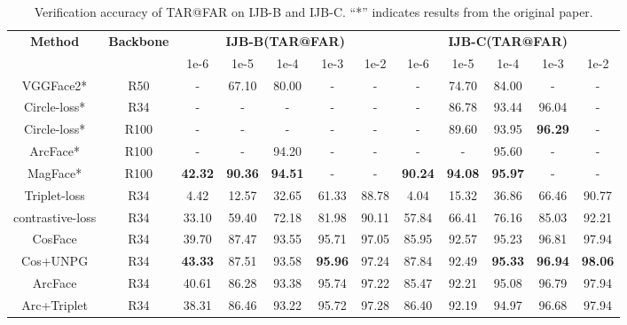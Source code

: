 \documentclass[10pt,twocolumn]{article}
\begin{document}
\begin{table*}[htb]
    \caption{Verification accuracy of TAR@FAR on IJB-B and IJB-C. “*” indicates results from the original paper.}
    \label{tab:IJBB_IJBC}
      \centering
        {\small
        \begin{tabular}[]{ c c c c c c c c c c c c }
         \hline
         \multirow{2}{*}{\textbf{Method}} & \multirow{2}{*}{\textbf{Backbone}} &  \multicolumn{5}{c}{\textbf{IJB-B(TAR@FAR)}} & \multicolumn{5}{c}{\textbf{IJB-C(TAR@FAR)}} \\
         \cline{3-12}
          & & 1e-6  & 1e-5 & 1e-4 & 1e-3 & 1e-2 & 1e-6 & 1e-5 & 1e-4 & 1e-3 & 1e-2\\
         \hline
         VGGFace2*\cite{cao2018vggface2} & R50 & - & 67.10 & 80.00 & - & - & - & 74.70 & 84.00 & - & - \\
         Circle-loss*\cite{sun2020circle} & R34 & - & - & - & - & - & - & 86.78 & 93.44 & 96.04 & - \\
         Circle-loss*\cite{sun2020circle} & R100 & - & - & - & - & - & - & 89.60 & 93.95 & \textbf{96.29} & - \\
         ArcFace*\cite{deng2019arcface} & R100 & - & - & 94.20 & - & - & - & - & 95.60 & - & - \\
         MagFace*\cite{meng2021magface} & R100 & \textbf{42.32} & \textbf{90.36} & \textbf{94.51} & - & - & \textbf{90.24} & \textbf{94.08} & \textbf{95.97} & - & - \\
         \hline
         Triplet-loss & R34 & 4.42 & 12.57 & 32.65 & 61.33 & 88.78 & 4.04 & 15.32 & 36.86 & 66.46 & 90.77 \\
         contrastive-loss & R34 & 33.10 & 59.40 & 72.18 & 81.98 & 90.11 & 57.84 & 66.41 & 76.16 & 85.03 & 92.21 \\
         CosFace\cite{wang2018cosface} & R34 & 39.70 & 87.47 & 93.55 & 95.71 & 97.05 & 85.95 & 92.57 & 95.23 & 96.81 & 97.94 \\
         \rowcolor{lightgray!20}
         Cos+UNPG & R34 & \textbf{\textcolor{NavyBlue}{43.33}} & 87.51 & 93.58 & \textbf{\textcolor{NavyBlue}{95.96}} & 97.24 & 87.84 & 92.49	& \textbf{\textcolor{NavyBlue}{95.33}} & \textbf{\textcolor{NavyBlue}{96.94}} & \textbf{\textcolor{NavyBlue}{98.06}} \\
ArcFace & R34 & 40.61 & 86.28 & 93.38 & 95.74 & 97.22 & 85.47 & 92.21 & 95.08 & 96.79 & 97.94 \\
         Arc+Triplet & R34 & 38.31 & 86.46 & 93.22 & 95.72 & 97.28 & 86.40 & 92.19 & 94.97 & 96.68 & 97.94 \\

\end{tabular}}
\end{table*}
\end{document}
